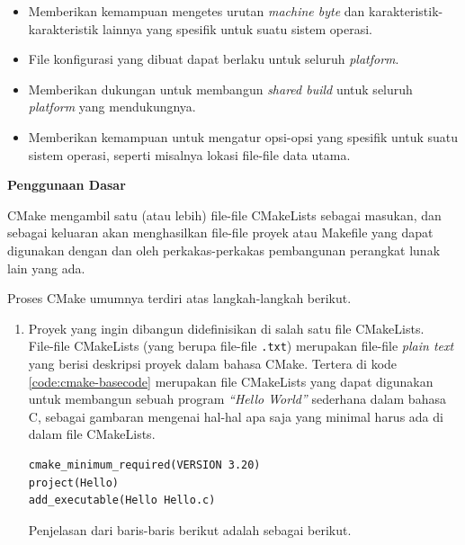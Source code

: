\documentclass[a4paper,twoside]{article}
\begin{document}
\begin{enumerate}
\begin{itemize}
	\item Memberikan kemampuan mengetes urutan \textit{machine byte} dan karakteristik-karakteristik lainnya yang spesifik untuk suatu sistem operasi.
	\item File konfigurasi yang dibuat dapat berlaku untuk seluruh \textit{platform}.
	\item Memberikan dukungan untuk membangun \textit{shared build} untuk seluruh \textit{platform} yang mendukungnya.
	\item Memberikan kemampuan untuk mengatur opsi-opsi yang spesifik untuk suatu sistem operasi, seperti misalnya lokasi file-file data utama.
\end{itemize}

\textbf{Penggunaan Dasar}

CMake mengambil satu (atau lebih) file-file CMakeLists sebagai masukan, dan sebagai keluaran akan menghasilkan file-file proyek atau Makefile yang dapat digunakan dengan dan oleh perkakas-perkakas pembangunan perangkat lunak lain yang ada.

Proses CMake umumnya terdiri atas langkah-langkah berikut.

\begin{enumerate}
	\item Proyek yang ingin dibangun didefinisikan di salah satu file CMakeLists.\\
	File-file CMakeLists (yang berupa file-file \verb|.txt|) merupakan file-file \textit{plain text} yang berisi deskripsi proyek dalam bahasa CMake. Tertera di kode \ref{code:cmake-basecode} merupakan file CMakeLists yang dapat digunakan untuk membangun sebuah program \textit{``Hello World''} sederhana dalam bahasa C, sebagai gambaran mengenai hal-hal apa saja yang minimal harus ada di dalam file CMakeLists.
	
	\begin{lstlisting}[caption=Kode utama operasional CMakeLists, label=code:cmake-basecode]
cmake_minimum_required(VERSION 3.20)
project(Hello)
add_executable(Hello Hello.c)
	\end{lstlisting}
	
	Penjelasan dari baris-baris berikut adalah sebagai berikut.
	

\end{enumerate}
\end{enumerate}
\end{document}
